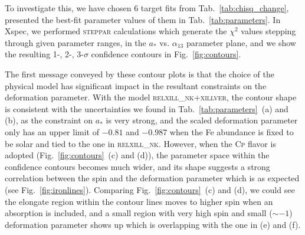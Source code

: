 \documentclass[11pt,a4paper,pdftex]{article}
\begin{document}
To investigate this, we have chosen 6 target fits from Tab.~\ref{tab:chisq_change}, presented the best-fit parameter values of them in Tab.~\ref{tab:parameters}. In {\sc Xspec}, we performed \textsc{steppar} calculations which generate the $\chi^2$ values stepping through given parameter ranges, in the $a_*$ vs. $\alpha_{13}$ parameter plane, and we show the resulting 1-, 2-, 3-$\sigma$ confidence contours in Fig.~\ref{fig:contours}. 


The first message conveyed by these contour plots is that the choice of the physical model has significant impact in the resultant constraints on the deformation parameter. With the model \textsc{relxill\_nk+xillver}, the contour shape is consistent with the uncertainties we found in Tab.~\ref{tab:parameters}~(a) and (b), as the constraint on $a_*$ is very strong, and the scaled deformation parameter only has an upper limit of $-0.81$ and $-0.987$ when the Fe abundance is fixed to be solar and tied to the one in \textsc{relxill\_nk}. However, when the \textsc{Cp} flavor is adopted (Fig.~\ref{fig:contours}~(c) and (d)), the parameter space within the confidence contours becomes much wider, and its shape suggests a strong correlation between the spin and the deformation parameter which is as expected (see Fig.~\ref{fig:ironlines}). Comparing Fig.~\ref{fig:contours}~(c) and (d), we could see the elongate region within the contour lines moves to higher spin when an absorption is included, and a small region with very high spin and small ($\sim-1$) deformation parameter shows up which is overlapping with the one in (e) and (f).
\end{document}
